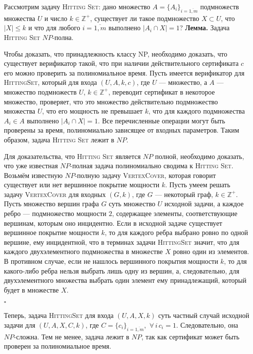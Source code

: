 \documentclass[10pt]{article}
\begin{document}
\par Рассмотрим задачу \textsc{Hitting Set}: дано множество $A=\{A_i\}_{i=\overline{1, m}}$ подмножеств множества $U$ и число $k\in\mathbb{Z}^+$, существует ли такое подмножество $X\subset U$, что $|X|\leq k$ и что для любого $i=\overline{1, m}$ выполнено $|A_i\cap X| = 1$?
\medskip
\textbf{Лемма.} Задача \textsc{Hitting Set} $NP$-полна.

\medskip\par 
Чтобы доказать, что принадлежность классу NP, необходимо доказать, что существует
верификатор такой, что при наличии действительного сертификата $c$ его можно проверить
за полиномиальное время. Пусть имеется верификатор для \textsc{HittingSet}, который для входа $(U, A, k, c)$, где $U$ --- множество, а $A$ --- множество подмножеств $U$, $k\in\mathbb{Z}^+$, переводит сертификат в некоторое множество, проверяет, что это множество действительно подмножество множества $U$, что его мощность не превышает $k$, что для каждого подмножества $A_i \in A$ выполнено $|A_i\cap X| = 1$. Все перечисленные операции могут быть проверены за время, полиномиально зависящее от входных параметров. Таким образом, задача \textsc{Hitting Set} лежит в $NP$.
\medskip\par 
Для доказательства, что \textsc{Hitting Set} является $NP$ полной, необходимо доказать, что уже известная $NP$-полная задача полиномиально сводима к \textsc{Hitting Set}. Возьмём известную $NP$-полную задачу \textsc{VertexCover}, которая говорит существует или нет вершинное покрытие мощности $k$. Пусть умеем решать задачу \textsc{VertexCover} для входных $(G, k)$, где $G$ --- некоторый граф, $k\in\mathbb{Z}^+$. Пусть множество вершин графа $G$ суть множество $U$ исходной задачи, а каждое ребро --- подмножество мощности $2$, содержащее элементы, соответствующие вершинам, которым оно инцидентно. Если в исходной задаче существует вершинное покрытие мощности $k$, то для каждого ребра выбрано ровно по одной вершине, ему инцидентной, что в терминах задачи \textsc{HittingSet} значит, что для каждого двухэлементного подмножества в множестве $X$ ровно один из элементов. В противном случае, если не нашлось вершинного покрытия мощности $k$, то для какого-либо ребра нельзя выбрать лишь одну из вершин, а, следовательно, для двухэлементного множества выбрать один элемент ему принадлежащий, который будет в множестве $X$.
\begin{flushright}
$\square$
\end{flushright}
\par
Теперь, задача \textsc{HittingSet} для входа $(U, A, X, k)$ суть частный случай исходной задачи для $(U, A, X, C, k)$, где $C=\{c_i\}_{i=\overline{1, m}},$ $\forall\, i\, c_i=1$. Следовательно, она $NP$-сложна. Тем не менее, задача лежит в $NP$, так как сертификат может быть проверен за полиномиальное время.
\end{document}
